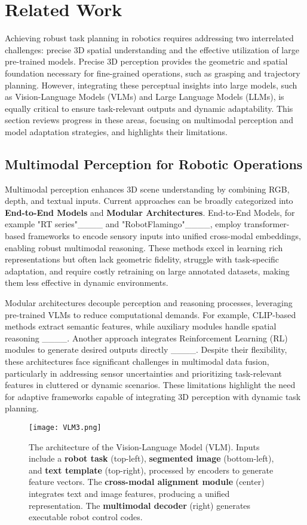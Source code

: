 \section{Related Work}
Achieving robust task planning in robotics requires addressing two interrelated challenges: precise 3D spatial understanding and the effective utilization of large pre-trained models. Precise 3D perception provides the geometric and spatial foundation necessary for fine-grained operations, such as grasping and trajectory planning. However, integrating these perceptual insights into large models, such as Vision-Language Models (VLMs) and Large Language Models (LLMs), is equally critical to ensure task-relevant outputs and dynamic adaptability. This section reviews progress in these areas, focusing on multimodal perception and model adaptation strategies, and highlights their limitations.
\subsection{Multimodal Perception for Robotic Operations}

Multimodal perception enhances 3D scene understanding by combining RGB, depth, and textual inputs. Current approaches can be broadly categorized into \textbf{End-to-End Models} and \textbf{Modular Architectures}. End-to-End Models, for example "RT series"____ and "RobotFlamingo"____, employ transformer-based frameworks to encode sensory inputs into unified cross-modal embeddings, enabling robust multimodal reasoning. These methods excel in learning rich representations but often lack geometric fidelity, struggle with task-specific adaptation, and require costly retraining on large annotated datasets, making them less effective in dynamic environments.

Modular architectures decouple perception and reasoning processes, leveraging pre-trained VLMs to reduce computational demands. For example, CLIP-based methods extract semantic features, while auxiliary modules handle spatial reasoning ____. Another approach integrates Reinforcement Learning (RL) modules to generate desired outputs directly ____. Despite their flexibility, these architectures face significant challenges in multimodal data fusion, particularly in addressing sensor uncertainties and prioritizing task-relevant features in cluttered or dynamic scenarios. These limitations highlight the need for adaptive frameworks capable of integrating 3D perception with dynamic task planning.


\begin{figure}[t]
	\centering
	\texttt{[image: VLM3.png]}
	\caption{
		The architecture of the Vision-Language Model (VLM). Inputs include a \textbf{robot task} (top-left), \textbf{segmented image} (bottom-left), and \textbf{text template} (top-right), processed by encoders to generate feature vectors. The \textbf{cross-modal alignment module} (center) integrates text and image features, producing a unified representation. The \textbf{multimodal decoder} (right) generates executable robot control codes.
	}
	
	\label{fig_2}
\end{figure}



